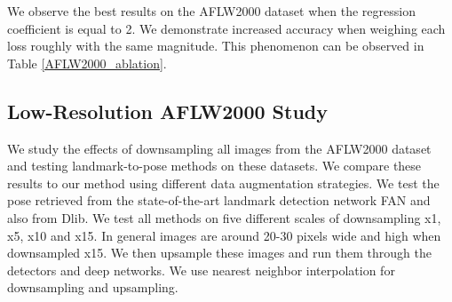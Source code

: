 \documentclass[10pt,twocolumn,letterpaper]{article}
\begin{document}
We observe the best results on the AFLW2000 dataset when the regression coefficient is equal to 2. We demonstrate increased accuracy when weighing each loss roughly with the same magnitude. This phenomenon can be observed in Table \ref{AFLW2000_ablation}.

\begin{table}[]
\centering
{}
\caption{Ablation analysis: MAE across different models and regression loss weights on the AFLW2000 dataset.}
\label{AFLW2000_ablation}
\end{table}

\subsection{Low-Resolution AFLW2000 Study}\label{sec4-G}
We study the effects of downsampling all images from the AFLW2000 dataset and testing landmark-to-pose methods on these datasets. We compare these results to our method using different data augmentation strategies.
We test the pose retrieved from the state-of-the-art landmark detection network FAN and also from Dlib. We test all methods on five different scales of downsampling x1, x5, x10 and x15. In general images are around 20-30 pixels wide and high when downsampled x15. We then upsample these images and run them through the detectors and deep networks. We use nearest neighbor interpolation for downsampling and upsampling.
\end{document}

